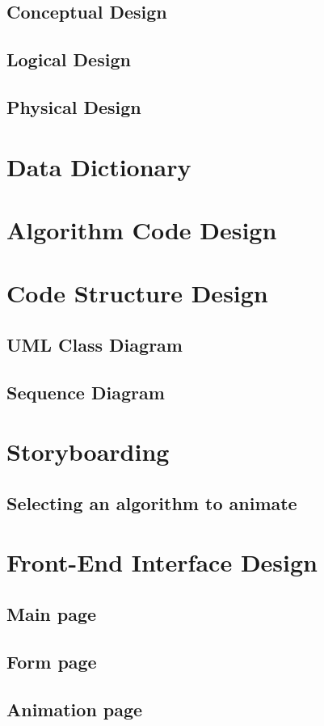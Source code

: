 \subsection{Conceptual Design}
\subsection{Logical Design}
\subsection{Physical Design}

\section{Data Dictionary}

\section{Algorithm Code Design}

\section{Code Structure Design}
\subsection{UML Class Diagram}
\subsection{Sequence Diagram}

\section{Storyboarding}
\subsection{Selecting an algorithm to animate}

\section{Front-End Interface Design}
\subsection{Main page}
\subsection{Form page}
\subsection{Animation page}



